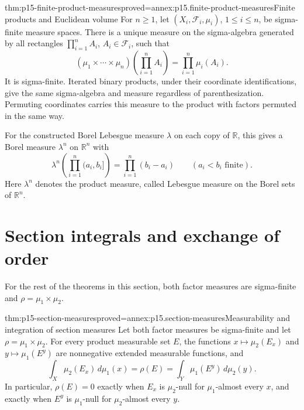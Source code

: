 \begin{hbtheorem}{thm:p15-finite-product-measures}{proved=annex:p15.finite-product-measures}{Finite products and Euclidean volume}
For \(n\geq1\), let \((X_i,\mathcal F_i,\mu_i)\), \(1\leq i\leq n\),
be sigma-finite measure spaces. There is a unique measure on the
sigma-algebra generated by all rectangles \(\prod_{i=1}^n A_i\),
\(A_i\in\mathcal F_i\), such that
\[
 (\mu_1\times\cdots\times\mu_n)
       \left(\prod_{i=1}^n A_i\right)=\prod_{i=1}^n\mu_i(A_i).
\]
It is sigma-finite. Iterated binary products, under their coordinate
identifications, give the same sigma-algebra and measure regardless of
parenthesization. Permuting coordinates carries this measure to the
product with factors permuted in the same way.

For the constructed Borel Lebesgue measure \(\lambda\) on each copy
of \(\mathbb R\), this gives a Borel measure \(\lambda^n\) on
\(\mathbb R^n\) with
\[
 \lambda^n\left(\prod_{i=1}^n(a_i,b_i]\right)
                               =\prod_{i=1}^n(b_i-a_i)
       \qquad(a_i<b_i\text{ finite}).
\]
Here \(\lambda^n\) denotes the product measure, called Lebesgue
measure on the Borel sets of \(\mathbb R^n\).
\end{hbtheorem}

\section{Section integrals and exchange of order}
\label{sec:p15-tonelli-fubini}

For the rest of the theorems in this section, both factor measures are
sigma-finite and \(\rho=\mu_1\times\mu_2\).

\begin{hblemma}{thm:p15-section-measures}{proved=annex:p15.section-measures}{Measurability and integration of section measures}
Let both factor measures be sigma-finite and let
\(\rho=\mu_1\times\mu_2\). For every product measurable set \(E\), the functions
\(x\mapsto\mu_2(E_x)\) and \(y\mapsto\mu_1(E^y)\)
are nonnegative extended measurable functions, and
\[
 \int_X\mu_2(E_x)\,d\mu_1(x)
   =\rho(E)
   =\int_Y\mu_1(E^y)\,d\mu_2(y).
\]
In particular, \(\rho(E)=0\) exactly when \(E_x\) is
\(\mu_2\)-null for \(\mu_1\)-almost every \(x\), and exactly
when \(E^y\) is \(\mu_1\)-null for \(\mu_2\)-almost every \(y\).
\end{hblemma}


